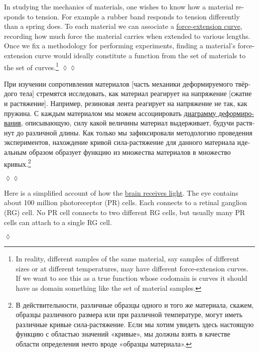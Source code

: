 \documentclass[a4paper]{book}
\theoremstyle{myth}
\newtheorem{excENG}[envENG]{\begin{english}Exercise\end{english}}
\newtheorem{appENG}[envENG]{\begin{english}Application\end{english}}
\newenvironment{exerciseENG}{\begin{excENG}}{\hspace*{\fill}$\lozenge$\end{excENG}}
\newenvironment{applicationENG}{\begin{appENG}}{\hspace*{\fill}$\lozenge\lozenge$\end{appENG}}
\newtheorem{appRUS}[envRUS]{\begin{russian}Прикладной пример (применение)\end{russian}}
\newenvironment{applicationRUS}{\begin{appRUS}}{\hspace*{\fill}$\lozenge\lozenge$\end{appRUS}}
\begin{document}
\begin{english}
\begin{applicationENG}\label{app:force-extension}
In studying the mechanics of materials, one wishes to know how a material responds to tension. For example a rubber band responds to tension differently than a spring does. To each material we can associate a \href{http://en.wikipedia.org/wiki/Stress–strain_curve}{\text force-extension curve}, recording how much force the material carries when extended to various lengths. Once we fix a methodology for performing experiments, finding a material's force-extension curve would ideally constitute a function from the set of materials to the set of curves.\footnote{In reality, different samples of the same material, say samples of different sizes or at different temperatures, may have different force-extension curves. If we want to see this as a true function whose codomain is curves it should have as domain something like the set of material samples.}
\end{applicationENG}

\begin{applicationRUS}\label{app:force-extension}
\begin{russian}
При изучении сопротивления материалов [часть механики деформируемого твёрдого тела] стремятся исследовать, как материал реагирует на напряжение [сжатие и растяжение]. Например, резиновая лента реагирует на напряжение не так, как пружина. С каждым материалом мы можем ассоциировать \href{https://ru.wikipedia.org/wiki/%D0%94%D0%B8%D0%B0%D0%B3%D1%80%D0%B0%D0%BC%D0%BC%D0%B0_%D0%B4%D0%B5%D1%84%D0%BE%D1%80%D0%BC%D0%B8%D1%80%D0%BE%D0%B2%D0%B0%D0%BD%D0%B8%D1%8F}{\text диаграмму деформирования}, описывающую, силу какой величины материал выдерживает, будучи растянут до различной длины. Как только мы зафиксировали методологию проведения экспериментов, нахождение кривой сила-растяжение для данного материала идеальным образом образует функцию из множества материалов в множество кривых.\footnote{В действительности, различные образцы одного и того же материала, скажем, образцы различного размера или при различной температуре, могут иметь различные кривые сила-растяжение. Если мы хотим увидеть здесь настоящую функцию с областью значений «кривые», мы должны взять в качестве области определения нечто вроде «образцы материала».} 
\end{russian}
\end{applicationRUS}

\begin{exerciseENG}
Here is a simplified account of how the \href{http://en.wikipedia.org/wiki/Retina}{\text brain receives light}. The eye contains about 100 million photoreceptor (PR) cells. Each connects to a retinal ganglion (RG) cell. No PR cell connects to two different RG cells, but usually many PR cells can attach to a single RG cell. 


\end{exerciseENG}
\end{english}
\end{document}
